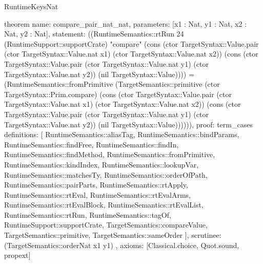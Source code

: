 \begin{lexlean}{RuntimeKeysNat}
\begin{semanticmodule}
theorem{
  name: compare_pair_nat_nat,
  parameters: [x1 : Nat, y1 : Nat, x2 : Nat, y2 : Nat],
  statement: ((RuntimeSemantics::rtRun 24 (RuntimeSupport::supportCrate) "compare" (cons (ctor TargetSyntax::Value.pair (ctor TargetSyntax::Value.nat x1) (ctor TargetSyntax::Value.nat x2)) (cons (ctor TargetSyntax::Value.pair (ctor TargetSyntax::Value.nat y1) (ctor TargetSyntax::Value.nat y2)) (nil TargetSyntax::Value)))) = (RuntimeSemantics::fromPrimitive (TargetSemantics::primitive (ctor TargetSyntax::Prim.compare) (cons (ctor TargetSyntax::Value.pair (ctor TargetSyntax::Value.nat x1) (ctor TargetSyntax::Value.nat x2)) (cons (ctor TargetSyntax::Value.pair (ctor TargetSyntax::Value.nat y1) (ctor TargetSyntax::Value.nat y2)) (nil TargetSyntax::Value)))))),
  proof: term_cases{
    definitions: [
      RuntimeSemantics::aliasTag,
      RuntimeSemantics::bindParams,
      RuntimeSemantics::findFree,
      RuntimeSemantics::findIn,
      RuntimeSemantics::findMethod,
      RuntimeSemantics::fromPrimitive,
      RuntimeSemantics::kindIndex,
      RuntimeSemantics::lookupVar,
      RuntimeSemantics::matchesTy,
      RuntimeSemantics::orderOfPath,
      RuntimeSemantics::pairParts,
      RuntimeSemantics::rtApply,
      RuntimeSemantics::rtEval,
      RuntimeSemantics::rtEvalArms,
      RuntimeSemantics::rtEvalBlock,
      RuntimeSemantics::rtEvalList,
      RuntimeSemantics::rtRun,
      RuntimeSemantics::tagOf,
      RuntimeSupport::supportCrate,
      TargetSemantics::compareValue,
      TargetSemantics::primitive,
      TargetSemantics::sameOrder
    ],
    scrutinee: (TargetSemantics::orderNat x1 y1)
  },
  axioms: [Classical.choice, Quot.sound, propext]
}


\end{semanticmodule}
\end{lexlean}
